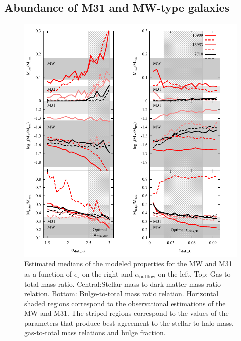 \documentclass[usenatbib]{mn2e}
\begin{document}
\subsection{Abundance of M31 and MW-type galaxies}
\begin{figure}
\includegraphics{figures/LG/LG-props-params-multi-v2.pdf}
\caption{Estimated medians of the modeled properties for the MW and M31 as a function of $\epsilon_{\star}$ on the right and $\alpha_{\text{outflow}}$ on the left.
 Top: Gas-to-total mass ratio. Central:Stellar mass-to-dark matter mass ratio relation.  Bottom: Bulge-to-total mass ratio relation. Horizontal shaded regions correspond to the observational
estimations of the MW and M31. The striped regions correspond to the values of the parameters that produce best agreement to the stellar-to-halo mass, gas-to-total mass relations and bulge
fraction.
\label{fig:properties-runs-LG}}
\end{figure}
\end{document}
